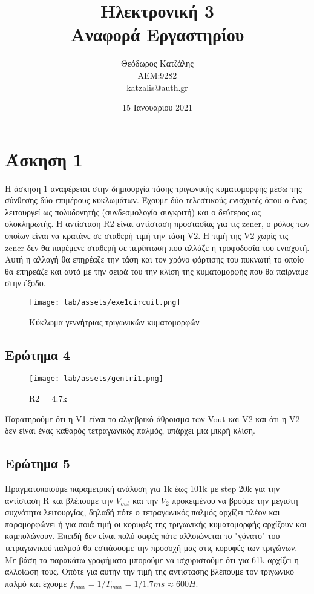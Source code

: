 \documentclass[12pt, a4paper]{article}
\title{\textbf{Ηλεκτρονική 3} \\ \textbf{Αναφορά Εργαστηρίου}}
\author{Θεόδωρος Κατζάλης \\ ΑΕΜ:9282 \\ katzalis@auth.gr}
\date{15 Ιανουαρίου 2021}
\begin{document}
\maketitle
\sloppy
\tableofcontents
\pagebreak

\section{Άσκηση 1}

Η άσκηση 1 αναφέρεται στην δημιουργία τάσης τριγωνικής κυματομορφής μέσω της σύνθεσης δύο επιμέρους κυκλωμάτων. Έχουμε δύο τελεστικούς ενισχυτές όπου ο ένας λειτουργεί ως πολυδονητής (συνδεσμολογία συγκριτή) και ο δεύτερος ως ολοκληρωτής. Η αντίσταση  R2 είναι αντίσταση προστασίας για τις zener, ο ρόλος των οποίων είναι να κρατάνε σε σταθερή τιμή την τάση V2. Η τιμή της V2 χωρίς τις zener δεν θα παρέμενε σταθερή σε περίπτωση που αλλάζε η τροφοδοσία του ενισχυτή. Αυτή η αλλαγή θα επηρέαζε την τάση και τον χρόνο φόρτισης του πυκνωτή το οποίο θα επηρεάζε και αυτό με την σειρά του την κλίση της κυματομορφής που θα παίρναμε στην έξοδο.



\begin{figure}[h!]
	\centering
	\texttt{[image: lab/assets/exe1circuit.png]}
	\caption{Κύκλωμα γεννήτριας τριγωνικών κυματομορφών}
\end{figure}


\subsection{Ερώτημα 4}

\begin{figure}[h!]
    \centering
	\texttt{[image: lab/assets/gentri1.png]}
    \caption{R2 = 4.7k}
\end{figure}

Παρατηρούμε ότι η V1 είναι το αλγεβρικό άθροισμα των Vout και V2 και ότι η V2 δεν είναι ένας καθαρός τετραγωνικός παλμός, υπάρχει μια μικρή κλίση.



\subsection{Ερώτημα 5}

Πραγματοποιούμε παραμετρική ανάλυση για 1k έως 101k με step 20k για την αντίσταση R και βλέπουμε την $V_{out}$ και την $V_2$ προκειμένου να βρούμε την μέγιστη συχνότητα λειτουργίας, δηλαδή πότε ο τετραγωνικός παλμός αρχίζει πλέον και παραμορφώνει ή για ποιά τιμή οι κορυφές της τριγωνικής κυματομορφής αρχίζουν και καμπυλώνουν. Επειδή δεν είναι πολύ σαφές πότε αλλοιώνεται το "γόνατο" του τετραγωνικού παλμού θα εστιάσουμε την προσοχή μας στις κορυφές των τριγώνων. Με βάση τα παρακάτω γραφήματα μπορούμε να ισχυριστούμε ότι για 61k αρχίζει η αλλοίωση τους. Οπότε για αυτήν την τιμή της αντίστασης βλέπουμε τον τριγωνικό παλμό και έχουμε $f_{max} = 1/T_{max} = 1/1.7ms \approx 600H$.
\end{document}
